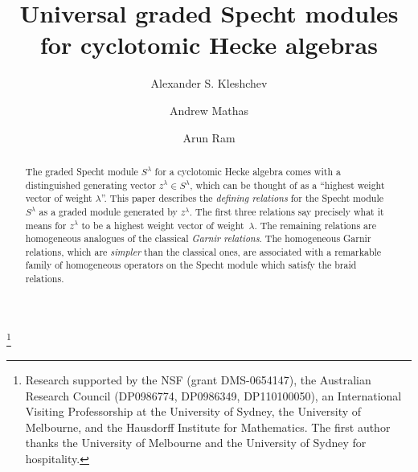 \documentclass[twoside,11pt,reqno]{amsart}
\numberwithin{equation}{section}
\theoremstyle{definition}  %
\newcommand\Comment[2][\relax]{\space\par\medskip\noindent%
   \fbox{\begin{minipage}{\textwidth}\textbf{Comment\ifx\relax#1\else---#1\fi}\newline%
        #2\end{minipage}}\medskip
}
\newcommand{\0}{{\bar 0}}
\newcommand{\1}{{\bar 1}}
\begin{document}

\title[Universal Specht modules]{{\bf Universal graded Specht modules for cyclotomic Hecke algebras}}

\author{\sc Alexander S. Kleshchev}
\address{Department of Mathematics\\ University of Oregon\\
Eugene\\ OR~97403, USA}

\author{\sc Andrew Mathas}
\address{School of Mathematics and Statistics F07, 
University of Sydney, NSW 2006, Australia}

\author{\sc Arun Ram}
\address{Department of Mathematics and Statistics,
University of Melbourne, VIC 3010, Australia}


\thanks{
Research supported by the NSF (grant DMS-0654147), the Australian Research Council (DP0986774, DP0986349, DP110100050),  an International
Visiting Professorship at the University of Sydney, the University of Melbourne, and the Hausdorff Institute for Mathematics. The first author thanks the University of Melbourne and the University of Sydney for hospitality.}


\begin{abstract}
The graded Specht module $S^\lambda$ for a cyclotomic Hecke algebra comes with a distinguished generating vector $z^\lambda\in S^\lambda$, which can be thought of as a ``highest weight vector of weight $\lambda$''. This paper describes the {\em defining relations} for the Specht module $S^\lambda$ as a graded module generated by $z^\lambda$. The first three relations say precisely what it means for $z^\lambda$ to be a highest weight vector of weight~$\lambda$. The remaining relations are homogeneous analogues of the classical {\em Garnir relations}. 
The homogeneous Garnir relations, which are {\em simpler} than the classical ones, are
associated with a remarkable family of homogeneous operators on the Specht module which satisfy the braid
relations.
\end{abstract}
\end{document}
